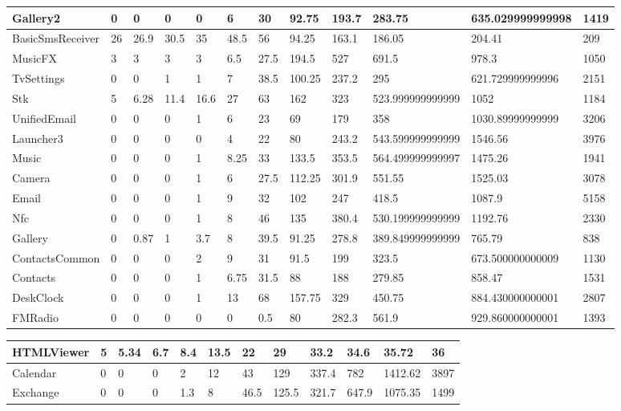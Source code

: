\documentclass[a4paper]{article}
\begin{document}
\begin{tabular}{|l|l|l|l|l|l|l|l|l|l|l|l|}
\hline
Gallery2&0&0&0&0&6&30&92.75&193.7&283.75&635.029999999998&1419\\
\hline
BasicSmsReceiver&26&26.9&30.5&35&48.5&56&94.25&163.1&186.05&204.41&209\\
\hline
MusicFX&3&3&3&3&6.5&27.5&194.5&527&691.5&978.3&1050\\
\hline
TvSettings&0&0&1&1&7&38.5&100.25&237.2&295&621.729999999996&2151\\
\hline
Stk&5&6.28&11.4&16.6&27&63&162&323&523.999999999999&1052&1184\\
\hline
UnifiedEmail&0&0&0&1&6&23&69&179&358&1030.89999999999&3206\\
\hline
Launcher3&0&0&0&0&4&22&80&243.2&543.599999999999&1546.56&3976\\
\hline
Music&0&0&0&1&8.25&33&133.5&353.5&564.499999999997&1475.26&1941\\
\hline
Camera&0&0&0&1&6&27.5&112.25&301.9&551.55&1525.03&3078\\
\hline
Email&0&0&0&1&9&32&102&247&418.5&1087.9&5158\\
\hline
Nfc&0&0&0&1&8&46&135&380.4&530.199999999999&1192.76&2330\\
\hline
Gallery&0&0.87&1&3.7&8&39.5&91.25&278.8&389.849999999999&765.79&838\\
\hline
ContactsCommon&0&0&0&2&9&31&91.5&199&323.5&673.500000000009&1130\\
\hline
Contacts&0&0&0&1&6.75&31.5&88&188&279.85&858.47&1531\\
\hline
DeskClock&0&0&0&1&13&68&157.75&329&450.75&884.430000000001&2807\\
\hline
FMRadio&0&0&0&0&0&0.5&80&282.3&561.9&929.860000000001&1393\\
\hline
\end{tabular}
\newline
\begin{tabular}{|l|l|l|l|l|l|l|l|l|l|l|l|}
\hline
HTMLViewer&5&5.34&6.7&8.4&13.5&22&29&33.2&34.6&35.72&36\\
\hline
Calendar&0&0&0&2&12&43&129&337.4&782&1412.62&3897\\
\hline
Exchange&0&0&0&1.3&8&46.5&125.5&321.7&647.9&1075.35&1499\\
\hline
\end{tabular}
\end{document}

